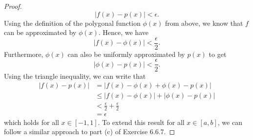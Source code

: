 \begin{enumerate}
\begin{proof}
			\[  |  f(x)  - p(x)  | < \epsilon. \]
			Using the definition of the polygonal function \( \phi(x)  \) from above, we know that \( f \) can be approximated by \( \phi(x)  \). Hence, we have 
			\[  | f(x) - \phi(x)  | < \frac{ \epsilon  }{ 2 }. \]
			Furthermore, \( \phi(x)  \) can also be uniformly approximated by \( p(x)  \) to get 
			\[  | \phi(x) - p(x)   | < \frac{ \epsilon  }{ 2  } .\] Using the triangle inequality, we can write that 
			\begin{align*}
			    | f(x) - p(x)  | &= | f(x) - \phi(x) + \phi(x) - p(x)  |  \\
								 &\leq | f(x) - \phi(x)  | + | \phi(x) - p(x)  | \\
								 &< \frac{ \epsilon  }{ 2  } + \frac{ \epsilon  }{ 2 } \\
								 &= \epsilon
			\end{align*}
			which holds for all \( x \in [-1,1]  \). To extend this result for all \( x \in [a,b]  \), we can follow a similar approach to part (c) of Exercise 6.6.7. 
		\end{proof}
\end{enumerate}










